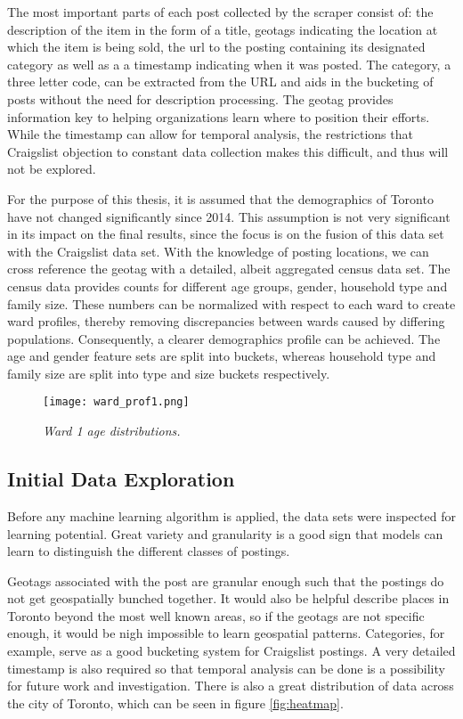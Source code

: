 \documentclass[12pt]{article}
\begin{document}
The most important parts of each post collected by the scraper consist of: the description of the item in the form of a title, geotags indicating the location at which the item is being sold, the url to the posting containing its designated category as well as a a timestamp indicating when it was posted. The category, a three letter code, can be extracted from the URL and aids in the bucketing of posts without the need for description processing. The geotag provides information key to helping organizations learn where to position their efforts. While the timestamp can allow for temporal analysis, the restrictions that Craigslist objection to constant data collection makes this difficult, and thus will not be explored. 

For the purpose of this thesis, it is assumed that the demographics of Toronto have not changed significantly since 2014. This assumption is not very significant in its impact on the final results, since the focus is on the fusion of this data set with the Craigslist data set. With the knowledge of posting locations, we can cross reference the geotag with a detailed, albeit aggregated census data set. The census data provides counts for different age groups, gender, household type and family size. These numbers can be normalized with respect to each ward to create ward profiles, thereby removing discrepancies between wards caused by differing populations. Consequently, a clearer demographics profile can be achieved. The age and gender feature sets are split into buckets, whereas household type and family size are split into type and size buckets respectively. 

\begin{figure}[h]
\centering
\texttt{[image: ward\_prof1.png]}
\caption{\textit{Ward 1 age distributions.}}
\end{figure}


\subsection{Initial Data Exploration}
Before any machine learning algorithm is applied, the data sets were inspected for learning potential. Great variety and granularity is a good sign that models can learn to distinguish the different classes of postings. 

Geotags associated with the post are granular enough such that the postings do not get geospatially bunched together. It would also be helpful describe places in Toronto beyond the most well known areas, so if the geotags are not specific enough, it would be nigh impossible to learn geospatial patterns. Categories, for example, serve as a good bucketing system for Craigslist postings. A very detailed timestamp is also required so that temporal analysis can be done is a possibility for future work and investigation. There is also a great distribution of data across the city of Toronto, which can be seen in figure \ref{fig:heatmap}. %
\end{document}
